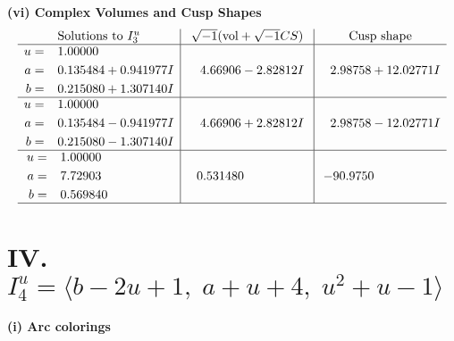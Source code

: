 \documentclass[1p]{elsarticle_modified}
\theoremstyle{definition}
\newcommand{\I}{\sqrt{-1}}
\begin{document}
\newpage\flushleft \textbf{(vi) Complex Volumes and Cusp Shapes}
$$\begin{array}{c|c|c}  
\text{Solutions to }I^u_{3}& \I (\text{vol} + \sqrt{-1}CS) & \text{Cusp shape}\\
 \hline 
\begin{aligned}
u &= \phantom{-}1.00000\phantom{ +0.000000I} \\
a &= \phantom{-}0.135484 + 0.941977 I \\
b &= \phantom{-}0.215080 + 1.307140 I\end{aligned}
 & \phantom{-}4.66906 - 2.82812 I & \phantom{-}2.98758 + 12.02771 I \\ \hline\begin{aligned}
u &= \phantom{-}1.00000\phantom{ +0.000000I} \\
a &= \phantom{-}0.135484 - 0.941977 I \\
b &= \phantom{-}0.215080 - 1.307140 I\end{aligned}
 & \phantom{-}4.66906 + 2.82812 I & \phantom{-}2.98758 - 12.02771 I \\ \hline\begin{aligned}
u &= \phantom{-}1.00000\phantom{ +0.000000I} \\
a &= \phantom{-}7.72903\phantom{ +0.000000I} \\
b &= \phantom{-}0.569840\phantom{ +0.000000I}\end{aligned}
 & \phantom{-}0.531480\phantom{ +0.000000I} & -90.9750\phantom{ +0.000000I}\\
 \hline 
 \end{array}$$\newpage\newpage\renewcommand{\arraystretch}{1}
\centering \section*{IV. $I^u_{4}= \langle b-2 u+1,\;a+u+4,\;u^2+u-1 \rangle$}
\flushleft \textbf{(i) Arc colorings}\\
\end{document}
